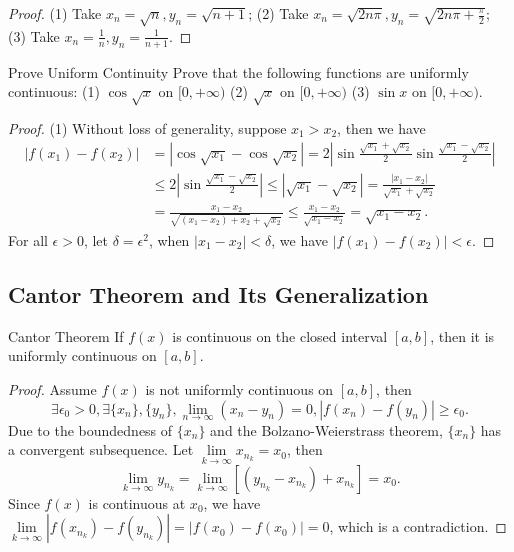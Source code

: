 \begin{proof}
  (1) Take $x_n = \sqrt{n}, y_n = \sqrt{n + 1}$;
  (2) Take $x_n = \sqrt{2n \pi}, y_n = \sqrt{2n \pi + \frac{\pi}{2}}$;
  (3) Take $x_n = \frac{1}{n}, y_n = \frac{1}{n+1}$.
\end{proof}

\begin{example}{Prove Uniform Continuity}{}
  Prove that the following functions are uniformly continuous:
  (1) $\cos \sqrt{x}$ on $[0, +\infty)$
  (2) $\sqrt{x}$ on $[0, +\infty)$
  (3) $\sin x$ on $[0, +\infty)$.
\end{example}

\begin{proof}
  (1) Without loss of generality, suppose $x_1 > x_2$,
  then we have
  \begin{align}
    |f(x_1) - f(x_2)| &= |\cos \sqrt{x_1} - \cos \sqrt{x_2}| = 2 \left| \sin \frac{\sqrt{x_1} + \sqrt{x_2}}{2} \sin \frac{\sqrt{x_1} - \sqrt{x_2}}{2} \right|\\
   & \leq 2 \left| \sin \frac{\sqrt{x_1} - \sqrt{x_2}}{2} \right| \leq |\sqrt{x_1} - \sqrt{x_2}| = \frac{|x_1 - x_2|}{\sqrt{x_1} + \sqrt{x_2}}\\
    & = \frac{x_1 - x_2}{\sqrt{(x_1 - x_2) + x_2} + \sqrt{x_2}} \leq \frac{x_1 - x_2}{\sqrt{x_1 - x_2}} = \sqrt{x_1 - x_2}.
  \end{align}
  For all $\epsilon > 0$, let $\delta = \epsilon^2$,
  when $|x_1 - x_2| < \delta$, we have $|f(x_1) - f(x_2)| < \epsilon$.
\end{proof}

\subsection{Cantor Theorem and Its Generalization}

\begin{theorem}{Cantor Theorem}{}
  If $f(x)$ is continuous on the closed interval $[a, b]$,
  then it is uniformly continuous on $[a, b]$.
\end{theorem}

\begin{proof}
  Assume $f(x)$ is not uniformly continuous on $[a, b]$,
  then
  \begin{equation}
    \exists \epsilon_0 > 0, \exists \{x_n\}, \{y_n\},
    \lim \limits _{n \rightarrow \infty} (x_n - y_n) = 0,
    |f(x_n) - f(y_n)| \geq \epsilon_0.
  \end{equation}
  Due to the boundedness of $\{x_n\}$ and the Bolzano-Weierstrass theorem,
  $\{x_n\}$ has a convergent subsequence.
  Let $\lim \limits _{k \rightarrow \infty}x_{n_k} = x_0$,
  then
  \begin{equation}
    \lim \limits _{k \rightarrow \infty} y_{n_k}
    = \lim \limits _{k \rightarrow \infty}[(y_{n_k} - x_{n_k}) + x_{n_k}] = x_0.
  \end{equation}
  Since $f(x)$ is continuous at $x_0$,
  we have $\lim \limits _{k \rightarrow \infty}|f(x_{n_k}) - f(y_{n_k})| =
  |f(x_0) - f(x_0)| = 0$, which is a contradiction.
\end{proof}

